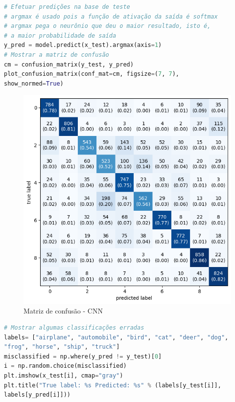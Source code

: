 \begin{lstlisting}[language=Python, style=input]
# Efetuar predições na base de teste
# argmax é usado pois a função de ativação da saída é softmax
# argmax pega o neurônio que deu o maior resultado, isto é,
# a maior probabilidade de saída
y_pred = model.predict(x_test).argmax(axis=1)
# Mostrar a matriz de confusão
cm = confusion_matrix(y_test, y_pred)
plot_confusion_matrix(conf_mat=cm, figsize=(7, 7),
show_normed=True)
\end{lstlisting}

\begin{figure}[H]
\centering
\includegraphics[width=.8\linewidth]{apendices/fig/9_IAA009_3.png}
\caption{Matriz de confusão - CNN}
\end{figure}

\begin{lstlisting}[language=Python, style=input]
# Mostrar algumas classificações erradas
labels= ["airplane", "automobile", "bird", "cat", "deer", "dog",
"frog", "horse", "ship", "truck"]
misclassified = np.where(y_pred != y_test)[0]
i = np.random.choice(misclassified)
plt.imshow(x_test[i], cmap="gray")
plt.title("True label: %s Predicted: %s" % (labels[y_test[i]],
labels[y_pred[i]]))
\end{lstlisting}

